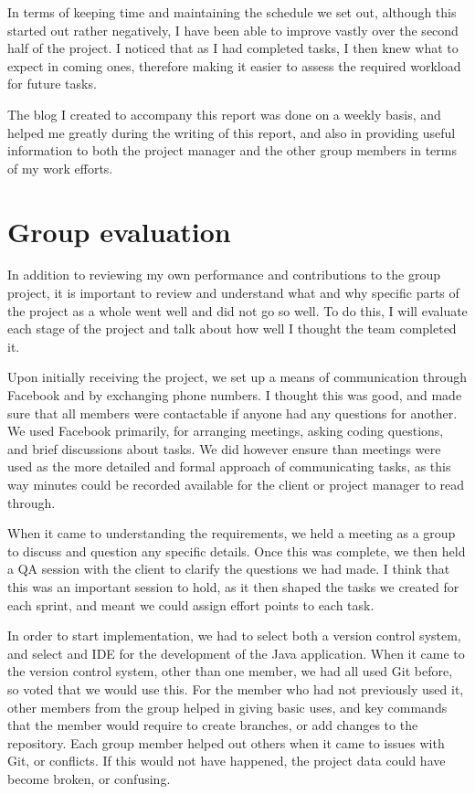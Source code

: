 In terms of keeping time and maintaining the schedule we set out, although this started out rather negatively, I have been able to improve vastly over the second half of the project. I noticed that as I had completed tasks, I then knew what to expect in coming ones, therefore making it easier to assess the required workload for future tasks. \par
The blog I created to accompany this report was done on a weekly basis, and helped me greatly during the writing of this report, and also in providing useful information to both the project manager and the other group members in terms of my work efforts. 
\section{Group evaluation}
In addition to reviewing my own performance and contributions to the group project, it is important to review and understand what and why specific parts of the project as a whole went well and did not go so well. To do this, I will evaluate each stage of the project and talk about how well I thought the team completed it. \par
Upon initially receiving the project, we set up a means of communication through Facebook and by exchanging phone numbers. I thought this was good, and made sure that all members were contactable if anyone had any questions for another. We used Facebook primarily, for arranging meetings, asking coding questions, and brief discussions about tasks. We did however ensure than meetings were used as the more detailed and formal approach of communicating tasks, as this way minutes could be recorded available for the client or project manager to read through. \par
When it came to understanding the requirements, we held a meeting as a group to discuss and question any specific details. Once this was complete, we then held a QA session with the client to clarify the questions we had made. I think that this was an important session to hold, as it then shaped the tasks we created for each sprint, and meant we could assign effort points to each task. \par
In order to start implementation, we had to select both a version control system, and select and IDE for the development of the Java application. When it came to the version control system, other than one member, we had all used Git before, so voted that we would use this. For the member who had not previously used it, other members from the group helped in giving basic uses, and key commands that the member would require to create branches, or add changes to the repository. Each group member helped out others when it came to issues with Git, or conflicts. If this would not have happened, the project data could have become broken, or confusing. \par
